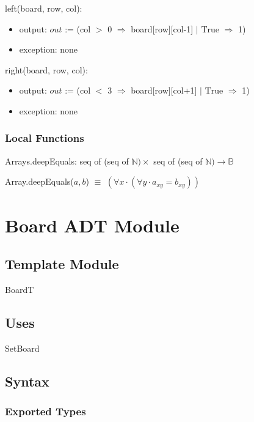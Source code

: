 \documentclass[12pt]{article}
\begin{document}
\noindent left(board, row, col):
\begin{itemize}
\item output: $out$ := (col $>$ 0 $\Rightarrow$  board[row][col-1] $|$ $\text{True}$ $\Rightarrow$ 1)
\item exception: none
\end{itemize}

\noindent right(board, row, col):
\begin{itemize}
\item output: $out$ := (col $<$ 3 $\Rightarrow$  board[row][col+1] $|$ $\text{True}$ $\Rightarrow$ 1)
\item exception: none
\end{itemize}

\subsubsection* {Local Functions}

Arrays.deepEquals: seq of (seq of $\mathbb{N}) \times$ seq of (seq of $\mathbb{N}) \rightarrow \mathbb{B}$ 

\medskip

\noindent Array.deepEquals($a, b$) $\equiv$ $(\forall x \cdot (\forall y \cdot a_{xy} = b_{xy}))$ 


\newpage

\section* {Board ADT Module}

\subsection*{Template Module}

BoardT

\subsection* {Uses}

SetBoard

\subsection* {Syntax}

\subsubsection* {Exported Types}
\end{document}
